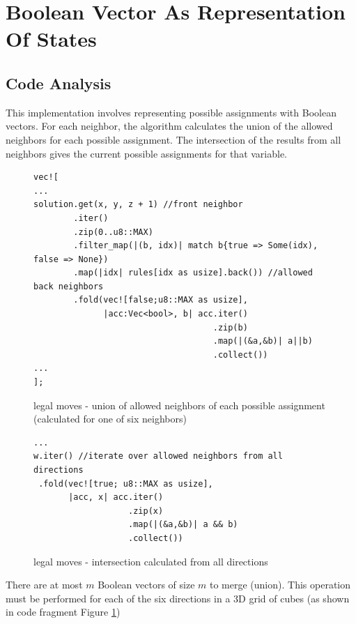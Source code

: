\documentclass[shortabstract, english, inz]{iithesis}
\begin{document}
\break\break\break
\section{Boolean Vector As Representation Of States}
\subsection{Code Analysis}
This implementation involves representing possible assignments with Boolean vectors.  For each neighbor, the algorithm calculates the union of the allowed neighbors for each possible assignment.  The intersection of the results from all neighbors gives the current possible assignments for that variable.





\begin{figure}
\begin{verbatim}
vec![
...
solution.get(x, y, z + 1) //front neighbor
        .iter()
        .zip(0..u8::MAX)
        .filter_map(|(b, idx)| match b{true => Some(idx), false => None})
        .map(|idx| rules[idx as usize].back()) //allowed back neighbors
        .fold(vec![false;u8::MAX as usize],
              |acc:Vec<bool>, b| acc.iter()
                                    .zip(b)
                                    .map(|(&a,&b)| a||b)
                                    .collect())
...
];

\end{verbatim}
\caption{legal moves - union of allowed neighbors of each possible assignment (calculated for one of six neighbors)}
\label{fig:legal-union}
\end{figure}

\begin{figure}
\begin{verbatim}
...
w.iter() //iterate over allowed neighbors from all directions
 .fold(vec![true; u8::MAX as usize],
       |acc, x| acc.iter()
                   .zip(x)
                   .map(|(&a,&b)| a && b)
                   .collect())
\end{verbatim}
\caption{legal moves - intersection calculated from all directions}
\label{fig:legal-intersection}
\end{figure}

There are at most \( m \) Boolean vectors of size \( m \) to merge (union). This operation must be performed for each of the six directions in a 3D grid of cubes (as shown in code fragment Figure \ref{fig:legal-union})
\end{document}
